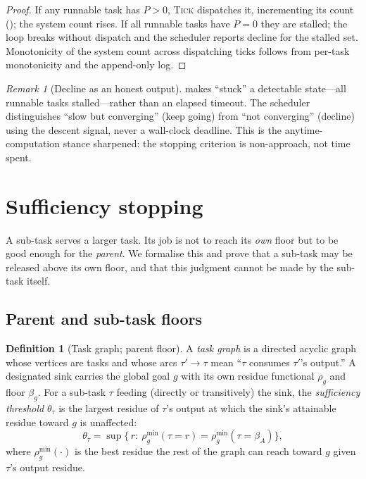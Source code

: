 \documentclass[twocolumn,10pt,a4paper]{article}
\theoremstyle{thmstyle}
\theoremstyle{definition}
\newtheorem{definition}[theorem]{Definition}
\theoremstyle{remark}
\newtheorem{remark}[theorem]{Remark}
\newcommand{\floor}{\beta}
\newcommand{\res}{\rho}
\newcommand{\task}{\tau}
\begin{document}
\begin{proof}
If any runnable task has $P>0$, \textsc{Tick} dispatches it, incrementing
its count (); the system count rises. If all runnable
tasks have $P=0$ they are stalled; the loop breaks without dispatch and
the scheduler reports decline for the stalled set. Monotonicity of the
system count across dispatching ticks follows from per-task monotonicity
and the append-only log.
\end{proof}

\begin{remark}[Decline as an honest output]
\label{rem:decline}
 makes ``stuck'' a detectable state---all runnable
tasks stalled---rather than an elapsed timeout. The scheduler distinguishes
``slow but converging'' (keep going) from ``not converging'' (decline)
using the descent signal, never a wall-clock deadline. This is the
anytime-computation stance \citep{dean1988,zilberstein1996} sharpened: the
stopping criterion is non-approach, not time spent.
\end{remark}

\section{Sufficiency stopping}
\label{sec:sufficiency}

A sub-task serves a larger task. Its job is not to reach its \emph{own}
floor but to be good enough for the \emph{parent}. We formalise this and
prove that a sub-task may be released above its own floor, and that this
judgment cannot be made by the sub-task itself.

\subsection{Parent and sub-task floors}

\begin{definition}[Task graph; parent floor]
\label{def:taskgraph}
A \emph{task graph} is a directed acyclic graph whose vertices are tasks
and whose arcs $\task'\!\to\!\task$ mean ``$\task$ consumes $\task'$'s
output.'' A designated sink carries the global goal $g$ with its own
residue functional $\res_g$ and floor $\floor_g$. For a sub-task $\task$
feeding (directly or transitively) the sink, the \emph{sufficiency
threshold} $\theta_\task$ is the largest residue of $\task$'s output at
which the sink's attainable residue toward $g$ is unaffected:
\[
\theta_\task=\sup\big\{\,r:\ \res_g^{\min}(\task\!=\!r)=\res_g^{\min}(\task\!=\!\floor_A)\big\},
\]
where $\res_g^{\min}(\cdot)$ is the best residue the rest of the graph can
reach toward $g$ given $\task$'s output residue.
\end{definition}
\end{document}
